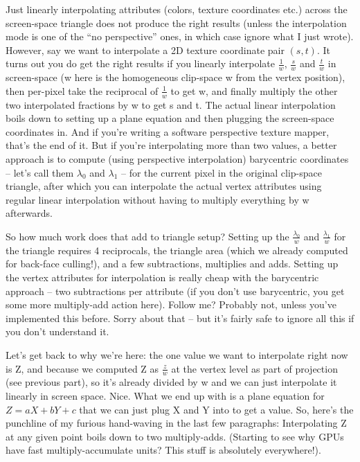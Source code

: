 \documentclass[12pt]{article}
\begin{document}
Just linearly interpolating attributes (colors, texture coordinates etc.) across the screen-space triangle does not produce the right results (unless the interpolation mode is one of the “no perspective” ones, in which case ignore what I just wrote). However, say we want to interpolate a 2D texture coordinate pair \((s,t)\). It turns out you do get the right results if you linearly interpolate \(\frac{1}{w}\), \(\frac{s}{w}\) and \(\frac{t}{w}\) in screen-space (w here is the homogeneous clip-space w from the vertex position), then per-pixel take the reciprocal of \(\frac{1}{w}\) to get w, and finally multiply the other two interpolated fractions by w to get s and t. The actual linear interpolation boils down to setting up a plane equation and then plugging the screen-space coordinates in. And if you’re writing a software perspective texture mapper, that’s the end of it. But if you’re interpolating more than two values, a better approach is to compute (using perspective interpolation) barycentric coordinates – let’s call them \(\lambda_0\) and \(\lambda_1\) – for the current pixel in the original clip-space triangle, after which you can interpolate the actual vertex attributes using regular linear interpolation without having to multiply everything by w afterwards.

So how much work does that add to triangle setup? Setting up the \(\frac{\lambda_0}{w}\) and \(\frac{\lambda_1}{w}\) for the triangle requires 4 reciprocals, the triangle area (which we already computed for back-face culling!), and a few subtractions, multiplies and adds. Setting up the vertex attributes for interpolation is really cheap with the barycentric approach – two subtractions per attribute (if you don’t use barycentric, you get some more multiply-add action here). Follow me? Probably not, unless you’ve implemented this before. Sorry about that – but it’s fairly safe to ignore all this if you don’t understand it.

Let’s get back to why we’re here: the one value we want to interpolate right now is Z, and because we computed Z as \(\frac{z}{w}\) at the vertex level as part of projection (see previous part), so it’s already divided by w and we can just interpolate it linearly in screen space. Nice. What we end up with is a plane equation for \(Z = aX + bY + c\) that we can just plug X and Y into to get a value. So, here’s the punchline of my furious hand-waving in the last few paragraphs: Interpolating Z at any given point boils down to two multiply-adds. (Starting to see why GPUs have fast multiply-accumulate units? This stuff is absolutely everywhere!).
\end{document}
